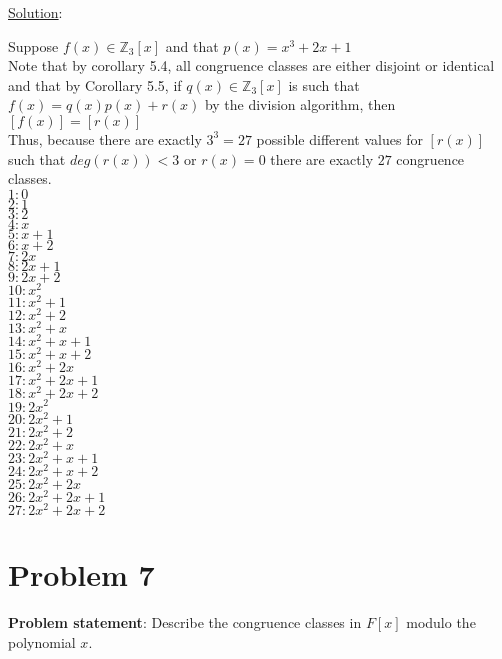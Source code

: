 \documentclass{article} %
\begin{document}
\underline{Solution}: 
\begin{addmargin}[1em]{0em}
Suppose $f(x) \in \mathbb{Z}_3[x]$ and that $p(x) = x^3 + 2x + 1$
\\Note that by corollary 5.4, all congruence classes are either disjoint or identical and that by Corollary 5.5, if $q(x) \in \mathbb{Z}_3[x]$ is such that $f(x) = q(x)p(x) + r(x)$ by the division algorithm, then $[f(x)] = [r(x)]$
\\Thus, because there are exactly $3^3 = 27$ possible different values for $[r(x)]$ such that $deg(r(x)) < 3$ or $r(x) = 0$ there are exactly $27$ congruence classes.
\\$1: 0$
\\$2: 1$
\\$3: 2$
\\$4: x$
\\$5: x+1$
\\$6: x+2$
\\$7: 2x$
\\$8: 2x + 1$
\\$9: 2x + 2$
\\$10: x^2$
\\$11: x^2 + 1$
\\$12: x^2 + 2$
\\$13: x^2 + x$
\\$14: x^2 + x+1$
\\$15: x^2 + x+2$
\\$16: x^2 + 2x$
\\$17: x^2 + 2x + 1$
\\$18: x^2 + 2x + 2$
\\$19: 2x^2$
\\$20: 2x^2 + 1$
\\$21: 2x^2 + 2$
\\$22: 2x^2 + x$
\\$23: 2x^2 + x+1$
\\$24: 2x^2 + x+2$
\\$25: 2x^2 + 2x$
\\$26: 2x^2 + 2x + 1$
\\$27: 2x^2 + 2x + 2$
\end{addmargin}

\newpage

\section*{Problem 7}


\textbf{Problem statement}: Describe the congruence classes in $F[x]$ modulo the polynomial $x$.
\\
\end{document}
